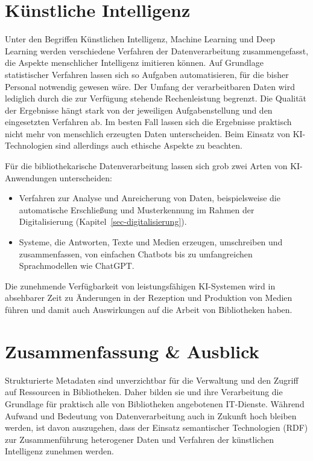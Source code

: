 \documentclass[
  11pt,
  letterpaper,
  DIV=11,
  twoside]{scrreprt}
\begin{document}
\section{Künstliche Intelligenz}\label{kuxfcnstliche-intelligenz}

Unter den Begriffen Künstlichen Intelligenz, Machine Learning und Deep
Learning werden verschiedene Verfahren der Datenverarbeitung
zusammengefasst, die Aspekte menschlicher Intelligenz imitieren können.
Auf Grundlage statistischer Verfahren lassen sich so Aufgaben
automatisieren, für die bisher Personal notwendig gewesen wäre. Der
Umfang der verarbeitbaren Daten wird lediglich durch die zur Verfügung
stehende Rechenleistung begrenzt. Die Qualität der Ergebnisse hängt
stark von der jeweiligen Aufgabenstellung und den eingesetzten Verfahren
ab. Im besten Fall lassen sich die Ergebnisse praktisch nicht mehr von
menschlich erzeugten Daten unterscheiden. Beim Einsatz von
KI-Technologien sind allerdings auch ethische Aspekte zu beachten.

Für die bibliothekarische Datenverarbeitung lassen sich grob zwei Arten
von KI-Anwendungen unterscheiden:

\begin{itemize}
\item
  Verfahren zur Analyse und Anreicherung von Daten, beispielsweise die
  automatische Erschließung und Musterkennung im Rahmen der
  Digitalisierung (Kapitel~\ref{sec-digitalisierung}).
\item
  Systeme, die Antworten, Texte und Medien erzeugen, umschreiben und
  zusammenfassen, von einfachen Chatbots bis zu umfangreichen
  Sprachmodellen wie ChatGPT.
\end{itemize}

Die zunehmende Verfügbarkeit von leistungsfähigen KI-Systemen wird in
absehbarer Zeit zu Änderungen in der Rezeption und Produktion von Medien
führen und damit auch Auswirkungen auf die Arbeit von Bibliotheken
haben.

\section{Zusammenfassung \& Ausblick}\label{zusammenfassung-ausblick}

Strukturierte Metadaten sind unverzichtbar für die Verwaltung und den
Zugriff auf Ressourcen in Bibliotheken. Daher bilden sie und ihre
Verarbeitung die Grundlage für praktisch alle von Bibliotheken
angebotenen IT-Dienste. Während Aufwand und Bedeutung von
Datenverarbeitung auch in Zukunft hoch bleiben werden, ist davon
auszugehen, dass der Einsatz semantischer Technologien (RDF) zur
Zusammenführung heterogener Daten und Verfahren der künstlichen
Intelligenz zunehmen werden.
\end{document}
